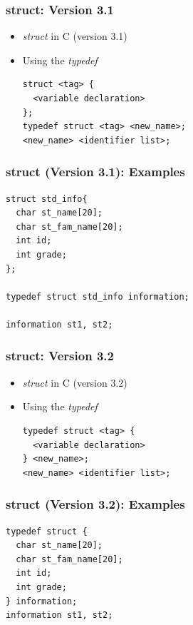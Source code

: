 \documentclass{../c-lecture}
\begin{document}
\begin{frame}[fragile]
  \frametitle{struct: Version 3.1}
  \begin{itemize}
    \item \textit{\color{Cyan} struct} in C (version 3.1)
    \item Using the \textit{\color{YellowOrange} typedef}
    \begin{verbatim}
struct <tag> {
  <variable declaration>
};
typedef struct <tag> <new_name>;
<new_name> <identifier list>;
    \end{verbatim}
  \end{itemize}
\end{frame}

\begin{frame}[fragile]
  \frametitle{struct (Version 3.1): Examples}
  \begin{verbatim}
struct std_info{
  char st_name[20];
  char st_fam_name[20];
  int id;
  int grade;
};

typedef struct std_info information;

information st1, st2;
  \end{verbatim}
\end{frame}

\begin{frame}[fragile]
  \frametitle{struct: Version 3.2}
  \begin{itemize}
    \item \textit{\color{Cyan} struct} in C (version 3.2)
    \item Using the \textit{\color{YellowOrange} typedef}
    \begin{verbatim}
typedef struct <tag> {
  <variable declaration>
} <new_name>;
<new_name> <identifier list>;
    \end{verbatim}
  \end{itemize}
\end{frame}

\begin{frame}[fragile]
  \frametitle{struct (Version 3.2): Examples}
  \begin{verbatim}
typedef struct {
  char st_name[20];
  char st_fam_name[20];
  int id;
  int grade;
} information;
information st1, st2;
  \end{verbatim}
\end{frame}
\end{document}
